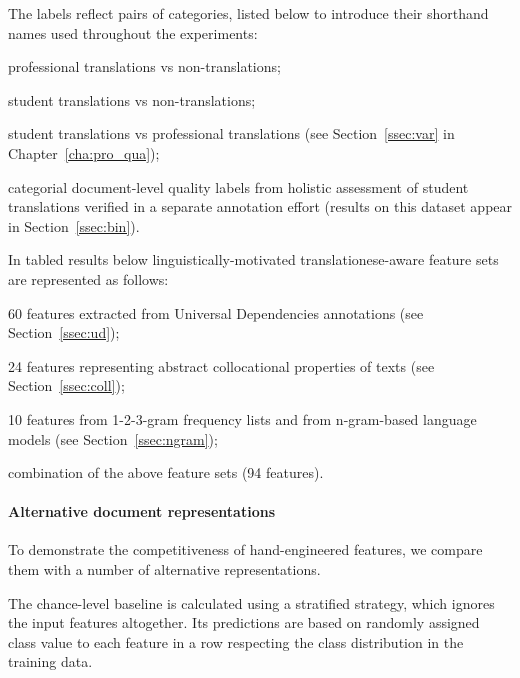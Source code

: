 The labels reflect pairs of categories, listed below to introduce their shorthand names used throughout the experiments:

\begin{description}\compresslist{}
	\item[pro vs ref:] professional translations vs non-translations;
	\item[stu vs ref:] student translations vs non-translations;
	\item[stu vs pro:] student translations vs professional translations (see Section~\ref{ssec:var} in Chapter~\ref{cha:pro_qua});
	\item[bad vs good:] categorial document-level quality labels from holistic assessment of student translations verified in a separate annotation effort (results on this dataset appear in Section~\ref{ssec:bin}).
\end{description}

In tabled results below linguistically-motivated translationese-aware feature sets are represented as follows:
\begin{description}\compresslist{}
	\item[UD:] 60 features extracted from Universal Dependencies annotations (see Section~\ref{ssec:ud});
	\item[collgram:] 24 features representing abstract collocational properties of texts (see Section~\ref{ssec:coll});
	\item[ngram:] 10 features from 1-2-3-gram frequency lists and from n-gram-based language models (see Section~\ref{ssec:ngram});
	\item[all:] combination of the above feature sets (94 features).
\end{description}  


\paragraph{\label{pg:vectors}Alternative document representations} To demonstrate the competitiveness of hand-engineered features, we compare them with a number of alternative representations. 

The chance-level baseline is calculated using a stratified strategy, which ignores the input features altogether. Its predictions are based on randomly assigned class value to each feature in a row respecting the class distribution in the training data.


